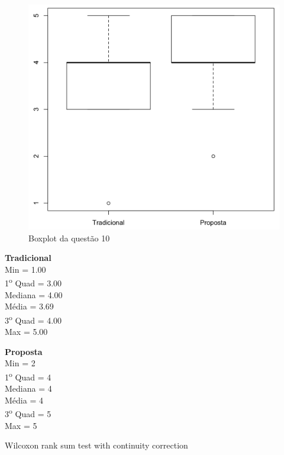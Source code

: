 \begin{figure}[htb]
  \caption{\label{fig:questao10-boxplot}Boxplot da questão 10}
  \begin{center}
      \includegraphics[scale=0.4]{./Figuras/questao10-boxplot.png}
  \end{center}
\end{figure}

\begin{multicols}{2}

\noindent\textbf{Tradicional}\\
Min = 1.00\\
1\textsuperscript{o} Quad = 3.00\\
Mediana = 4.00\\
Média = 3.69\\
3\textsuperscript{o} Quad = 4.00\\
Max = 5.00\\
\columnbreak

\noindent\textbf{Proposta}\\
Min = 2\\
1\textsuperscript{o} Quad = 4\\
Mediana = 4\\
Média = 4\\
3\textsuperscript{o} Quad = 5\\
Max = 5
\end{multicols}

Wilcoxon rank sum test with continuity correction

